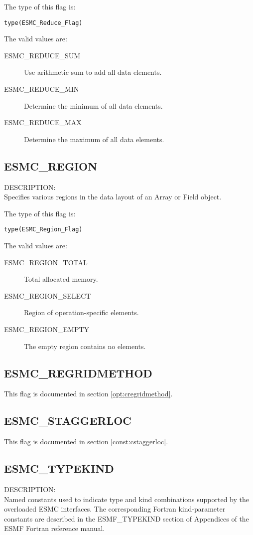 The type of this flag is:

{\tt type(ESMC\_Reduce\_Flag)}

The valid values are:
\begin{description}
\item [ESMC\_REDUCE\_SUM]
      Use arithmetic sum to add all data elements.
\item [ESMC\_REDUCE\_MIN]
      Determine the minimum of all data elements.
\item [ESMC\_REDUCE\_MAX]
      Determine the maximum of all data elements.
\end{description}

\subsection{ESMC\_REGION}
\label{const:cregion}
{\sf DESCRIPTION:\\}
Specifies various regions in the data layout of an Array or Field object.

The type of this flag is:

{\tt type(ESMC\_Region\_Flag)}

The valid values are:
\begin{description}
\item [ESMC\_REGION\_TOTAL]
      Total allocated memory.
\item [ESMC\_REGION\_SELECT]
      Region of operation-specific elements.
\item [ESMC\_REGION\_EMPTY]
      The empty region contains no elements.
\end{description}

\subsection{ESMC\_REGRIDMETHOD}
This flag is documented in section \ref{opt:cregridmethod}.

\subsection{ESMC\_STAGGERLOC}
This flag is documented in section \ref{const:cstaggerloc}.

\subsection{ESMC\_TYPEKIND}
\label{const:ctypekind}

{\sf DESCRIPTION:\\}
Named constants used to indicate type and kind combinations supported by the
overloaded ESMC interfaces. The corresponding Fortran kind-parameter constants 
are described in the ESMF\_TYPEKIND section of Appendices of the ESMF Fortran 
reference manual.

